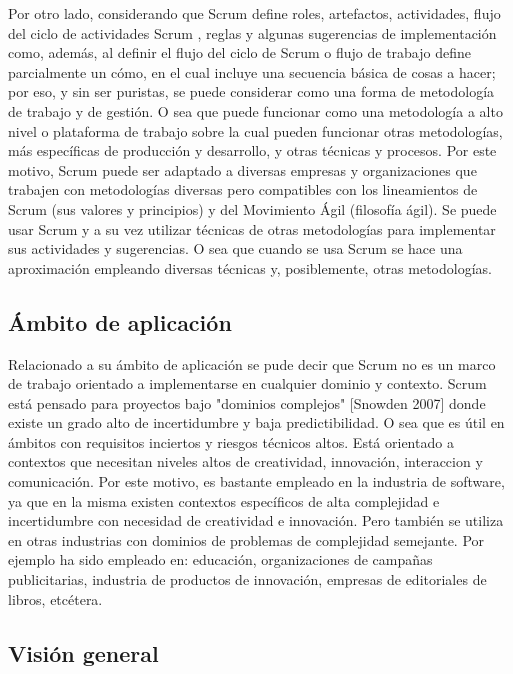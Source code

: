 Por otro lado, considerando que Scrum define roles, artefactos, actividades, flujo del ciclo de actividades Scrum \cite{Agile-Atlas-2012}, reglas y algunas sugerencias de implementación como, además, al definir el flujo del ciclo de Scrum o flujo de trabajo define parcialmente un cómo, en el cual incluye una secuencia básica de cosas a hacer; por eso, y sin ser puristas, se puede considerar como una forma de metodología de trabajo y de gestión. O sea que puede funcionar como una metodología a alto nivel o plataforma de trabajo sobre la cual pueden funcionar otras metodologías, más específicas de producción y desarrollo, y otras técnicas y procesos. Por este motivo, 
Scrum puede ser adaptado a diversas empresas y organizaciones que trabajen con metodologías diversas pero compatibles con los 
lineamientos de Scrum (sus valores y principios) y del Movimiento Ágil (filosofía ágil). Se puede usar Scrum y a su vez utilizar técnicas de otras metodologías para implementar sus actividades y sugerencias. O sea que cuando se usa Scrum se hace una aproximación empleando diversas técnicas y, posiblemente, otras metodologías.

\subsection{Ámbito de aplicación}

Relacionado a su ámbito de aplicación se pude decir que Scrum no es un marco de trabajo orientado a implementarse en cualquier dominio y contexto. Scrum está pensado para proyectos bajo "dominios complejos" [Snowden 2007] donde existe un grado alto de incertidumbre y baja predictibilidad. O sea que es útil en ámbitos con requisitos inciertos y riesgos técnicos altos. Está orientado a contextos que necesitan niveles altos de creatividad, innovación, interaccion y comunicación. Por este motivo, es bastante empleado en la industria de software, ya que en la misma existen contextos específicos de alta complejidad e incertidumbre con necesidad de creatividad e innovación. Pero también se utiliza en otras industrias con dominios de problemas de complejidad semejante. Por ejemplo ha sido empleado en: educación, organizaciones de campañas publicitarias, industria de productos de innovación, empresas de editoriales de libros, etcétera.

\subsection{Visión general}

